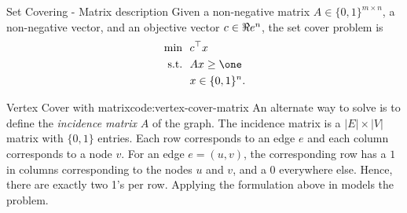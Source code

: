 

%

\begin{general}{Set Covering - Matrix description}{\npcomplete}
\label{general:set-covering-alternate}
Given a non-negative matrix $A \in \{0,1\}^{m \times n}$, a non-negative vector, and an objective vector $c \in \Re e^n$, the set cover problem is
\begin{equation}
\begin{split}
\min \ \ & c^\top x\\
\text{s.t.} \ \ & Ax \geq \one \\
& x \in \{0,1\}^n.
\end{split}
\end{equation}
\end{general}
\begin{examplewithoutcode}{Vertex Cover with matrix}{code:vertex-cover-matrix}
An alternate way to solve  is to define the \emph{incidence matrix} $A$ of the graph.  The incidence matrix is a $|E| \times |V|$ matrix with $\{0,1\}$ entries.  Each row corresponds to an edge $e$ and each column corresponds to a node $v$.  For an edge $e = (u,v)$, the corresponding row has a $1$ in columns corresponding to the nodes $u$ and $v$, and a 0 everywhere else.  Hence, there are exactly two 1's per row.  Applying the formulation above in  models the problem.
\end{examplewithoutcode}




%

